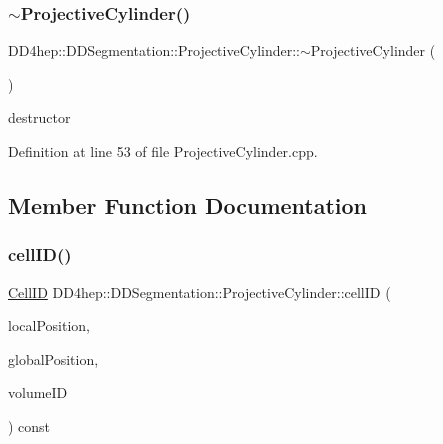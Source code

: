 \subsubsection{\texorpdfstring{$\sim$\+Projective\+Cylinder()}{~ProjectiveCylinder()}}
{\footnotesize\ttfamily D\+D4hep\+::\+D\+D\+Segmentation\+::\+Projective\+Cylinder\+::$\sim$\+Projective\+Cylinder (\begin{DoxyParamCaption}{ }\end{DoxyParamCaption})\hspace{0.3cm}{\ttfamily [virtual]}}



destructor 



Definition at line 53 of file Projective\+Cylinder.\+cpp.



\subsection{Member Function Documentation}
\hypertarget{class_d_d4hep_1_1_d_d_segmentation_1_1_projective_cylinder_ab90f41be410f8fbdc86278b2d11060ee}{}\label{class_d_d4hep_1_1_d_d_segmentation_1_1_projective_cylinder_ab90f41be410f8fbdc86278b2d11060ee} 
\subsubsection{\texorpdfstring{cell\+I\+D()}{cellID()}}
{\footnotesize\ttfamily \hyperlink{namespace_d_d4hep_1_1_d_d_segmentation_ac7af071d85cb48820914434a07e21ba1}{Cell\+ID} D\+D4hep\+::\+D\+D\+Segmentation\+::\+Projective\+Cylinder\+::cell\+ID (\begin{DoxyParamCaption}\item[{const \hyperlink{struct_d_d4hep_1_1_d_d_segmentation_1_1_vector3_d}{Vector3D} \&}]{local\+Position,  }\item[{const \hyperlink{struct_d_d4hep_1_1_d_d_segmentation_1_1_vector3_d}{Vector3D} \&}]{global\+Position,  }\item[{const \hyperlink{namespace_d_d4hep_1_1_d_d_segmentation_a61a6833a18d1800bdef176595f83e3ba}{Volume\+ID} \&}]{volume\+ID }\end{DoxyParamCaption}) const\hspace{0.3cm}{\ttfamily [virtual]}}



